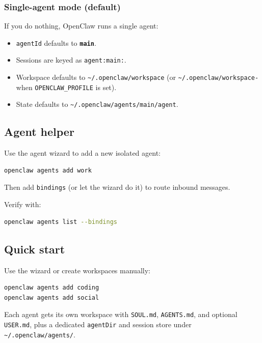 \subsubsection{Single-agent mode (default)}


If you do nothing, OpenClaw runs a single agent:

\begin{itemize}
  \item \texttt{agentId} defaults to \textbf{\texttt{main}}.
  \item Sessions are keyed as \texttt{agent:main:}.
  \item Workspace defaults to \texttt{\textasciitilde{}/.openclaw/workspace} (or \texttt{\textasciitilde{}/.openclaw/workspace-} when \texttt{OPENCLAW\_PROFILE} is set).
  \item State defaults to \texttt{\textasciitilde{}/.openclaw/agents/main/agent}.
\end{itemize}


\subsection{Agent helper}


Use the agent wizard to add a new isolated agent:

\begin{lstlisting}[language=bash]
openclaw agents add work
\end{lstlisting}


Then add \texttt{bindings} (or let the wizard do it) to route inbound messages.

Verify with:

\begin{lstlisting}[language=bash]
openclaw agents list --bindings
\end{lstlisting}


\subsection{Quick start}



Use the wizard or create workspaces manually:

\begin{lstlisting}[language=bash]
openclaw agents add coding
openclaw agents add social
\end{lstlisting}


Each agent gets its own workspace with \texttt{SOUL.md}, \texttt{AGENTS.md}, and optional \texttt{USER.md}, plus a dedicated \texttt{agentDir} and session store under \texttt{\textasciitilde{}/.openclaw/agents/}.



